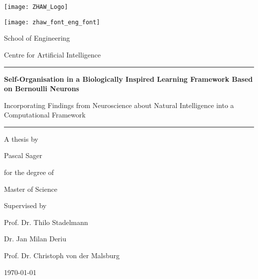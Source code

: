 \begin{titlepage}

\setlength{\parskip}{0pt}

\begin{center}
\texttt{[image: ZHAW\_Logo]}

\vspace{0.87cm}
{\texttt{[image: zhaw\_font\_eng\_font]}\par}
\vspace{0.4cm}
{\Large School of Engineering \par}
\vspace{0.15cm}
{\Large Centre for Artificial Intelligence\par}

\vspace{1.5cm}                            
\par\noindent\rule{\textwidth}{0.4pt}

\vspace{0.2cm}
{\par\huge\bfseries Self-Organisation in a Biologically Inspired Learning Framework Based on Bernoulli Neurons\par}
\vspace{0.4cm}
{\par\Large Incorporating Findings from Neuroscience about Natural Intelligence into a Computational Framework\par}
\vspace{0.2cm}  

\par\noindent\rule{\textwidth}{0.4pt}
\vspace{1.2cm}

{\par\noindent\large A thesis by}
\vspace{0.25cm}
{\par\noindent\Large Pascal Sager}
\vspace{1.0cm}
{\par\noindent\large for the degree of}
\vspace{0.25cm}
{\par\noindent\Large  Master of Science}
\vspace{1.0cm}

{\par\noindent\large Supervised by}
\vspace{0.25cm}
{\par\noindent\Large Prof. Dr. Thilo Stadelmann}
\vspace{0.2cm}
{\par\noindent\Large Dr. Jan Milan Deriu}
\vspace{0.2cm}
{\par\noindent\Large Prof. Dr. Christoph von der Malsburg}

\vspace{1.2cm} 
{\Large \today}

\end{center}
\end{titlepage}
\restoregeometry


